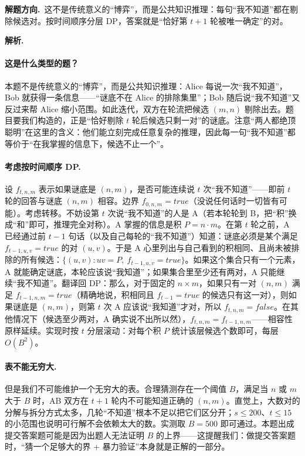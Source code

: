 \documentclass[UTF8,a4paper,11pt,oneside,openany,fontset=fandol]{ctexbook}
\theoremstyle{definition}
\newcommand{\sol}{\par\noindent\textbf{解析.}\ }
\newcommand{\hint}{\par\noindent\textbf{解题方向.}\ }
\begin{document}
\hint 这不是传统意义的“博弈”，而是公共知识推理：每句“我不知道”都在剔除候选对。按时间顺序分层 DP，答案就是“恰好第 $t+1$ 轮被唯一确定”的对。

\sol \paragraph{这是什么类型的题？} 本题不是传统意义的“博弈”，而是公共知识推理：Alice 每说一次“我不知道”，Bob 就获得一条信息——“谜底不在 Alice 的排除集里”；Bob 随后说“我不知道”又反过来帮 Alice 缩小范围。如此迭代，双方在轮流把候选 $(m,n)$ 剔除出去。题目要我们构造的，正是“恰好剔除 $t$ 轮后候选只剩一对”的谜底。注意“两人都绝顶聪明”在这里的含义：他们能立刻完成任意复杂的推理，因此每一句“我不知道”都等价于“在我掌握的信息下，候选不止一个”。

\paragraph{考虑按时间顺序 DP.} 设 $f_{t,n,m}$ 表示如果谜底是 $(n,m)$，是否可能连续说 $t$ 次“我不知道”——即前 $t$ 轮的回答与谜底 $(n,m)$ 相容。边界 $f_{0,n,m}=true$（没说任何话时一切皆有可能）。考虑转移。不妨设第 $t$ 次说“我不知道”的人是 A（若本轮轮到 B，把“积”换成“和”即可，推理完全对称）。A 掌握的信息是积 $P=n\cdot m$。在第 $t$ 轮之前，A 已经通过前 $t-1$ 句话（以及自己每轮的“我不知道”）知道：谜底必须是某个满足 $f_{t-1,u,v}=true$ 的对 $(u,v)$。于是 A 心里列出与自己看到的积相同、且尚未被排除的所有候选：$\{(u,v):uv=P,\ f_{t-1,u,v}=true\}$。如果这个集合只有一个元素，A 就能确定谜底，本轮应该说“我知道”；如果集合里至少还有两对，A 只能继续“我不知道”。翻译回 DP：那么，对于固定的 $n\times m$，如果只有一对 $(n,m)$ 满足 $f_{t-1,n,m}=true$（精确地说，积相同且 $f_{t-1}=true$ 的候选只有这一对），则如果谜底是 $(n,m)$，则第 $t$ 次 A 应该说“我知道”才对，所以 $f_{t,n,m}=false$。在其他情况下（候选至少两对，A 确实说不出所以然），$f_{t,n,m}=f_{t-1,n,m}$——相容性原样延续。实现时按 $t$ 分层滚动：对每个积 $P$ 统计该层候选个数即可，每层 $O(B^2)$。

\paragraph{表不能无穷大.} 但是我们不可能维护一个无穷大的表。合理猜测存在一个阈值 $B$，满足当 $n$ 或 $m$ 大于 $B$ 时，AB 双方在 $t+1$ 轮内不可能知道正确的 $(n,m)$。直觉上，大数对的分解与拆分方式太多，几轮“不知道”根本不足以把它们区分开；$s\le200$、$t\le15$ 的小范围也说明可行解不会依赖太大的数。实测取 $B=500$ 即可通过。本题出成提交答案题可能是因为出题人无法证明 $B$ 的上界——这提醒我们：做提交答案题时，“猜一个足够大的界 + 暴力验证”本身就是正解的一部分。
\end{document}
